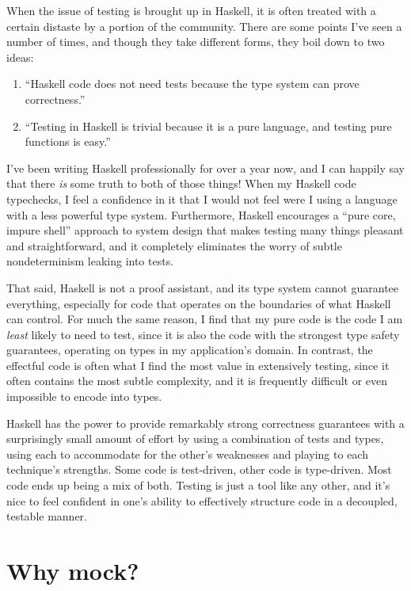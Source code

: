 When the issue of testing is brought up in Haskell, it is often treated
with a certain distaste by a portion of the community. There are some
points I've seen a number of times, and though they take different
forms, they boil down to two ideas:

\begin{enumerate}
\item
  ``Haskell code does not need tests because the type system can prove
  correctness.''
\item
  ``Testing in Haskell is trivial because it is a pure language, and
  testing pure functions is easy.''
\end{enumerate}
I've been writing Haskell professionally for over a year now, and I can
happily say that there \emph{is} some truth to both of those things!
When my Haskell code typechecks, I feel a confidence in it that I would
not feel were I using a language with a less powerful type system.
Furthermore, Haskell encourages a ``pure core, impure shell'' approach
to system design that makes testing many things pleasant and
straightforward, and it completely eliminates the worry of subtle
nondeterminism leaking into tests.

That said, Haskell is not a proof assistant, and its type system cannot
guarantee everything, especially for code that operates on the
boundaries of what Haskell can control. For much the same reason, I find
that my pure code is the code I am \emph{least} likely to need to test,
since it is also the code with the strongest type safety guarantees,
operating on types in my application's domain. In contrast, the
effectful code is often what I find the most value in extensively
testing, since it often contains the most subtle complexity, and it is
frequently difficult or even impossible to encode into types.

Haskell has the power to provide remarkably strong correctness
guarantees with a surprisingly small amount of effort by using a
combination of tests and types, using each to accommodate for the
other's weaknesses and playing to each technique's strengths. Some code
is test-driven, other code is type-driven. Most code ends up being a mix
of both. Testing is just a tool like any other, and it's nice to feel
confident in one's ability to effectively structure code in a decoupled,
testable manner.

\hypertarget{why-mock}{%
\section{Why mock?}\label{why-mock}}

